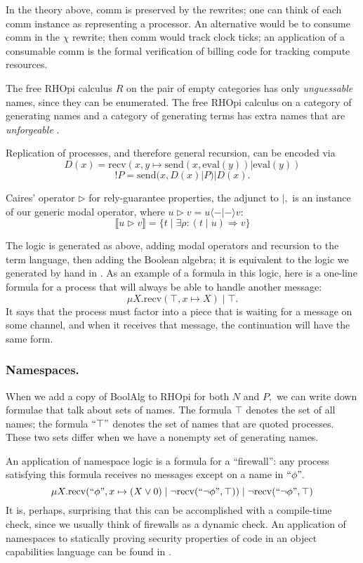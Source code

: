 \documentclass{llncs}
\newcommand{\interp}[1]{\llbracket #1 \rrbracket}
\newcommand{\maps}{\colon}
\newcommand{\send}{\mathrm{send}}
\newcommand{\recv}{\mathrm{recv}}
\renewcommand{\quote}[1]{``#1"}
\newcommand{\deref}[1]{\mathrm{eval}(#1)}
\begin{document}
In the theory above, comm is preserved by the rewrites; one can think of each comm instance as representing a processor.  An alternative would be to consume comm in the $\chi$ rewrite; then comm would track clock ticks; an application of a consumable comm is the formal verification of billing code for tracking compute resources.

The free RHOpi calculus $R$ on the pair of empty categories has only {\em unguessable} names, since they can be enumerated.  The free RHOpi calculus on a category of generating names and a category of generating terms has extra names that are {\em unforgeable} \cite{MillerYeeShapiro}.

Replication of processes, and therefore general recursion, can be encoded \cite{RHOcalc} via
\[D(x) = \recv(x, y\mapsto \send(x, \deref{y}) | \deref{y})\]
\[!P = \send(x, D(x) | P) | D(x).\]

Caires' \cite{Caires} operator $\triangleright$ for rely-guarantee properties, the adjunct to $|,$ is an instance of our generic modal operator, where $u \triangleright v = u \langle - | - \rangle v:$
\[ \interp{u \triangleright v} = \{ t \;|\; \exists \rho\maps (t\;|\;u) \Rightarrow v\} \]

The logic is generated as above, adding modal operators and recursion to the term language, then adding the Boolean algebra; it is equivalent to the logic we generated by hand in \cite{NamespaceLogic}.  As an example of a formula in this logic, here is a one-line formula for a process that will always be able to handle another message:
\[ \mu X. \recv(\top, x \mapsto X)\;|\;\top. \]
It says that the process must factor into a piece that is waiting for a message on some channel, and when it receives that message, the continuation will have the same form.

\subsubsection{Namespaces.}

When we add a copy of BoolAlg to RHOpi for both $N$ and $P,$ we can write down formulae that talk about sets of names.  The formula $\top$ denotes the set of all names; the formula $\quote{\top}$ denotes the set of names that are quoted processes.  These two sets differ when we have a nonempty set of generating names.

An application of namespace logic is a formula for a ``firewall'': any process satisfying this formula receives no messages except on a name in $\quote{\phi}.$
\[ \mu X. \recv(\quote{\phi}, x \mapsto (X \lor 0)\;|\;\neg\recv(\quote{\neg \phi}, \top))\;|\;\neg\recv(\quote{\neg \phi}, \top) \]
It is, perhaps, surprising that this can be accomplished with a compile-time check, since we usually think of firewalls as a dynamic check.  An application of namespaces to statically proving security properties of code in an object capabilities language can be found in \cite{MeredithStayDrossopolou}.
\end{document}
